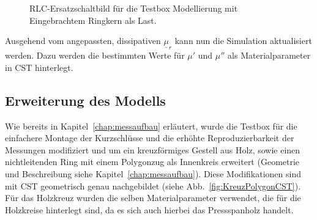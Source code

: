                 \begin{figure}[htb]
                    \centering
                    \caption{RLC-Ersatzschaltbild f\"ur die Testbox Modellierung mit Eingebrachtem Ringkern als Last.}
                    \label{fig:BoxRKCircuit}
                \end{figure}
                
            Ausgehend vom angepassten, dissipativen $\underline{\mu}_r$ kann nun die Simulation aktualisiert werden. Dazu werden die bestimmten Werte für $\mu'$ und $\mu''$ als Materialparameter in CST hinterlegt.
            
           
        \subsection{Erweiterung des Modells}
        Wie bereits in Kapitel~\ref{chap:messaufbau} erläutert, wurde die Testbox für die einfachere Montage der Kurzschlüsse und die erhöhte Reproduzierbarkeit der Messungen modifiziert und um ein kreuzförmiges Gestell aus Holz, sowie einen nichtleitenden Ring mit einem Polygonzug als Innenkreis erweitert (Geometrie und Beschreibung siehe Kapitel~\ref{chap:messaufbau}). Diese Modifikationen sind mit CST geometrisch genau nachgebildet (siehe Abb.~\ref{fig:KreuzPolygonCST}). Für das Holzkreuz wurden die selben Materialparameter verwendet, die für die Holzkreise hinterlegt sind, da es sich auch hierbei das Pressspanholz handelt.
        
